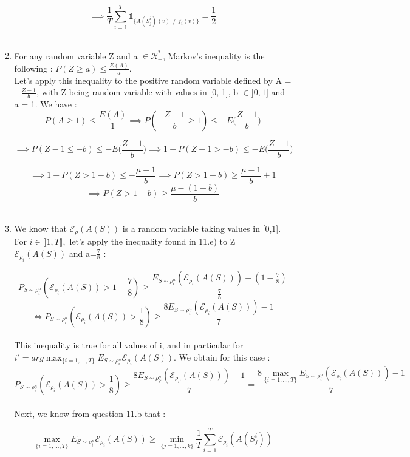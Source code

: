 \documentclass[final,3p,times,12pt]{article}
\begin{document}
\begin{enumerate}
\begin{enumerate}
\[ \implies 
\frac{1}{T} \sum_{i=1}^{T} \mathbb{1}_{\{A(S_j^i)(v) \neq f_i(v)\}} = \frac{1}{2}
\]\\
 \item 
For any random variable Z and a $\in \mathcal{R}_+^*$, Markov's inequality is the following : $P(Z \geq a) \leq \frac{E(A)}{a}$. \\

Let's apply this inequality to the positive random variable defined by A = $-\frac{Z-1}{b}$, with Z being random variable with values in [0, 1], b $\in ]0,1]$ and a = 1. We have : \\

\[ P( A\geq 1) \leq \frac{E(A)}{1} \implies P( -\frac{Z-1}{b}\geq 1) \leq -E\big(\frac{Z-1}{b}\big)
\]

\[ \implies P( Z-1 \leq -b) \leq -E\big(\frac{Z-1}{b}\big) \implies 1-P( Z-1 > -b) \leq -E\big(\frac{Z-1}{b}\big)
\]

\[ \implies 1-P( Z > 1-b) \leq -\frac{\mu-1}{b} \implies P( Z > 1-b) \geq \frac{\mu-1}{b} + 1 
\]
\[
\implies P( Z > 1-b) \geq \frac{\mu-(1-b)}{b}
\]
\\

\item 
We know that $\mathcal{E}_{\rho}(A(S))$ is a random variable taking values in [0,1]. For $i\in \llbracket 1,T\rrbracket,$ let's apply the inequality found in 11.e) to  Z=$\mathcal{E}_{\rho_i}(A(S))$ and a=$\frac{7}{8}$ : 

\[
 P_{S \sim \rho_i^n}( \mathcal{E}_{\rho_i}(A(S)) > 1-\frac{7}{8}) \geq \frac{E_{S \sim \rho_i^n}(\mathcal{E}_{\rho_i}(A(S)))-(1-\frac{7}{8})}{\frac{7}{8}}
\]
\[
 \Leftrightarrow P_{S \sim \rho_i^n}( \mathcal{E}_{\rho_i}(A(S)) > \frac{1}{8}) \geq \frac{8E_{S \sim \rho_i^n}(\mathcal{E}_{\rho_i}(A(S)))-1}{7}
\]\\

This inequality is true for all values of i, and in particular for $ i' = arg \max_{\{i=1, ..., T\}}E_{S \sim \rho_i^n} \mathcal{E}_{\rho_i}(A(S))$. We obtain for this case : \\ 

\[
 P_{S \sim \rho_i^n}( \mathcal{E}_{\rho_i}(A(S)) > \frac{1}{8}) \geq \frac{8E_{S \sim \rho_{i'}^n}(\mathcal{E}_{\rho_{i'}}(A(S)))-1}{7} = \frac{8\max_{\{i=1, ..., T\}}E_{S \sim \rho_{i}^n}(\mathcal{E}_{\rho_i}(A(S)))-1}{7}
\]\\

Next, we know from question 11.b that :

\[
\max_{\{i=1, ..., T\}}E_{S \sim \rho_i^n} \mathcal{E}_{\rho_i}(A(S)) \geq \min_{\{j=1, ..., k\}} \frac{1}{T} \sum_{i=1}^T \mathcal{E}_{\rho_i}(A(S_j^i)) 
\]\\


\end{enumerate}
\end{enumerate}
\end{document}
